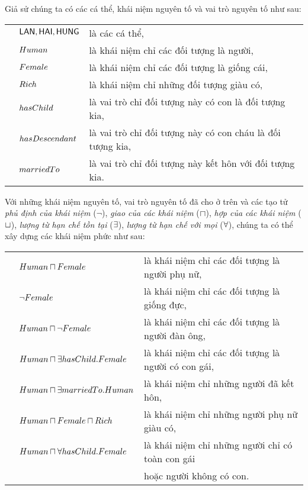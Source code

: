 \begin{Example}\label{ex:PrimitiveConcept}
	Giả sử chúng ta có các cá thể, khái niệm nguyên tố và vai trò nguyên tố như sau:\\[1.0ex]	
	\begin{tabular}{c l l}
		& $\mathsf{LAN}, \mathsf{HAI}, \mathsf{HUNG}$  & là các cá thể, \\[0.5ex]
		& $Human$   & là khái niệm chỉ các đối tượng là người, \\[0.5ex]
		& $Female$  & là khái niệm chỉ các đối tượng là giống cái,\\[0.5ex]
		& $Rich$    & là khái niệm chỉ những đối tượng giàu có,\\[0.5ex]
		& $hasChild$& là vai trò chỉ đối tượng này có con là đối tượng kia,\\[0.5ex]
		& $hasDescendant$& là vai trò chỉ đối tượng này có con cháu là đối tượng kia,\\[0.5ex]
		& $marriedTo$& là vai trò chỉ đối tượng này kết hôn với đối tượng kia.
	\end{tabular}
	
	Với những khái niệm nguyên tố, vai trò nguyên tố đã cho ở trên và các tạo tử {\em phủ định của khái niệm} ($\neg$), {\em giao của các khái niệm} ($\sqcap$), {\em hợp của các khái niệm} ($\sqcup$), {\em lượng từ hạn chế tồn tại} ($\exists$), {\em lượng từ hạn chế với mọi} ($\forall$), chúng ta có thể xây dựng các khái niệm phức như sau:\\[1.0ex]
	\begin{tabular}{c l l}
		& $Human \sqcap Female$ &\!\!\!là khái niệm chỉ các đối tượng là người phụ nữ,\\[0.5ex]
		& $\neg Female$         &\!\!\!là khái niệm chỉ các đối tượng là giống đực,\\[0.5ex]
		& $Human \sqcap \neg Female$ &\!\!\!là khái niệm chỉ các đối tượng là người đàn ông,\\[0.5ex]
		& $Human \sqcap \exists hasChild.Female$ &\!\!\!là khái niệm chỉ các đối tượng là người có con gái,\\[0.5ex]
		& $Human \sqcap \exists marriedTo.Human$ &\!\!\!là khái niệm chỉ những người đã kết hôn,\\[0.5ex]
		& $Human \sqcap Female \sqcap Rich$  &\!\!\!là khái niệm chỉ những người phụ nữ giàu có,\\[0.5ex]
		& $Human \sqcap \forall hasChild.Female$ &\!\!\!là khái niệm chỉ những người chỉ có toàn con gái\\[-0.45ex]
		&                                     &\!\!\!hoặc người không có con.
	\end{tabular}
	

\end{Example}
